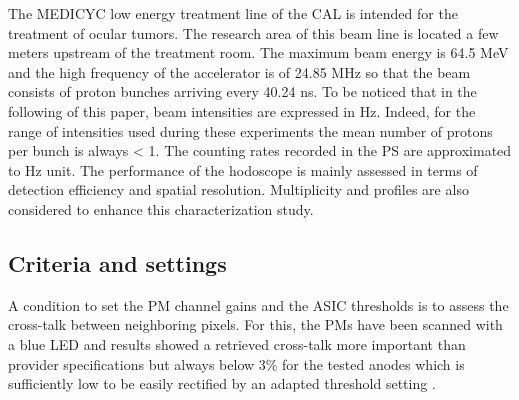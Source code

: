 \documentclass[a4paper,11pt]{article}
\begin{document}
The MEDICYC low energy treatment line of the CAL is intended for the treatment of ocular tumors. The research area of this beam line is located a few meters upstream of the treatment room. The maximum beam energy is 64.5 MeV and the high frequency of the accelerator is of 24.85 MHz so that the beam consists of proton bunches arriving every 40.24 ns. To be noticed that in the following of this paper, beam intensities are expressed in Hz. Indeed, for the range of intensities used during these experiments the mean number of protons per bunch is always < 1. The counting rates recorded in the PS are approximated to Hz unit.
The performance of the hodoscope is mainly assessed in terms of detection efficiency and spatial resolution. Multiplicity and profiles are also considered to enhance this characterization study.

\subsection{Criteria and settings}
\label{Settings}
A condition to set the PM channel gains and the ASIC thresholds is to assess the cross-talk between neighboring pixels. For this, the PMs have been scanned with a blue LED and results showed a retrieved cross-talk more important than provider specifications but always below 3\% for the tested anodes which is sufficiently low to be easily rectified by an adapted threshold setting \cite{FontanaPhD}.\\
\end{document}
